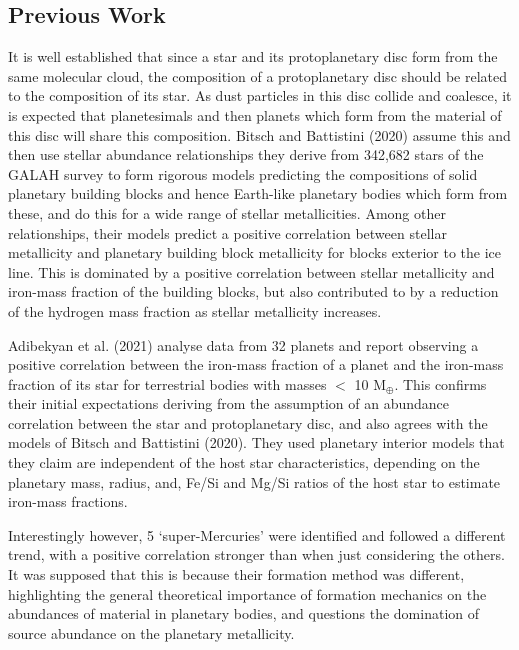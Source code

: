 \documentclass[a4paper,twocolumn,12pt]{article}
\begin{document}
\subsection{Previous Work}
\label{subsection: Previous Work}
It is well established that since a star and its protoplanetary disc form from the same molecular cloud, the composition of a protoplanetary disc should be related to the composition of its star. As dust particles in this disc collide and coalesce, it is expected that planetesimals and then planets which form from the material of this disc will share this composition. Bitsch and Battistini (2020)\cite{Bitsch&BattistiniTheoreticalModel} assume this and then use stellar abundance relationships they derive from 342,682 stars of the GALAH survey to form rigorous models predicting the compositions of solid planetary building blocks and hence Earth-like planetary bodies which form from these, and do this for a wide range of stellar metallicities. Among other relationships, their models predict a positive correlation between stellar metallicity and planetary building block metallicity for blocks exterior to the ice line. This is dominated by a positive correlation between stellar metallicity and iron-mass fraction of the building blocks, but also contributed to by a reduction of the hydrogen mass fraction as stellar metallicity increases.


Adibekyan et al. (2021)\cite{Adibekyan} analyse data from 32 planets and report observing a positive correlation between the iron-mass fraction of a planet and the iron-mass fraction of its star for terrestrial bodies with masses $<$ 10 M$_{\oplus}$. This confirms their initial expectations deriving from the assumption of an abundance correlation between the star and protoplanetary disc, and also agrees with the models of Bitsch and Battistini (2020). They used planetary interior models that they claim are independent of the host star characteristics, depending on the planetary mass, radius, and, Fe/Si and Mg/Si ratios of the host star \cite{SussyInteriorModelsSuper-EarthsAndSub-Neptunes} to estimate iron-mass fractions.

Interestingly however, 
5 `super-Mercuries' were identified and followed a different trend, with a positive correlation stronger than when just considering the others. It was supposed that this is because their formation method was different, highlighting the general theoretical importance of formation mechanics on the abundances of material in planetary bodies, and questions the domination of source abundance on the planetary metallicity.
\end{document}
